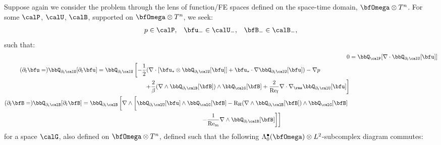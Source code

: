     Suppose again we consider the problem through the lens of function/FE spaces defined on the space-time domain, $\bfOmega\otimes T^{n}$. For some $\calP$, $\calU$, $\calB$, supported on $\bfOmega\otimes T^{n}$, we seek:
    \begin{align}
        p         \in  \calP,  &&
        \bfu_{-}  \in  \calU_{-},  &&
        \bfB_{-}  \in  \calB_{-},
    \end{align}
    such that:
    \begin{align}
            0
            &=
            \bbQ_{\calP}[\nabla\cdot\bbQ_{\partial_{t}\calU}[\bfu]]  \label{eqn:incompressible MHD weak form 1}  \\
        \begin{split}
            (\partial_{t}\bfu
            =)
            \bbQ_{\partial_{t}\calU}[\partial_{t}\bfu]
            &=
            \bbQ_{\partial_{t}\calU}\left[- \frac{1}{2}(\nabla\cdot\left[\bfu_{*}\otimes\bbQ_{\partial_{t}\calU}[\bfu]\right]
            + \bfu_{*}\cdot\nabla\bbQ_{\partial_{t}\calU}[\bfu])
            - \nabla p\right.  \\
            &\qquad\qquad\qquad\qquad\left.+ \frac{2}{\beta}(\nabla\wedge\bbQ_{\partial_{t}\calB}[\bfB])\wedge\bbQ_{\calG}[\bfB]
            + \frac{2}{\rmRef}\nabla\cdot\nabla_{\rms}\bbQ_{\partial_{t}\calU}[\bfu]\right]
        \end{split}  \\
        \begin{split}
            (\partial_{t}\bfB
            =)
            \bbQ_{\partial_{t}\calB}[\partial_{t}\bfB]
            &=
            \bbQ_{\partial_{t}\calB}\left[\nabla\wedge\left[\bbQ_{\partial_{t}\calU}[\bfu]\wedge\bbQ_{\calG}[\bfB]
            - \rmRH(\nabla\wedge\bbQ_{\partial_{t}\calB}[\bfB])\wedge\bbQ_{\calG}[\bfB]\tall\right.\right.  \\
            &\qquad\qquad\qquad\qquad\qquad\qquad\qquad\qquad\qquad\qquad\left.\left.- \frac{1}{\rmRem}\nabla\wedge\bbQ_{\partial_{t}\calB}[\bfB]\right]\right]
        \end{split}
    \end{align}
    for a space $\calG$, also defined on $\bfOmega\otimes T^{n}$, defined such that the following $\Lambda_{0}^{\bullet}(\bfOmega)\otimes L^{2}$-subcomplex diagram commutes:
    \begin{center}\end{center}
